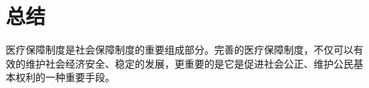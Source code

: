 
\section*{总结}

医疗保障制度是社会保障制度的重要组成部分。完善的医疗保障制度，不仅可以有效的维护社会经济安全、稳定的发展，更重要的是它是促进社会公正、维护公民基本权利的一种重要手段。
